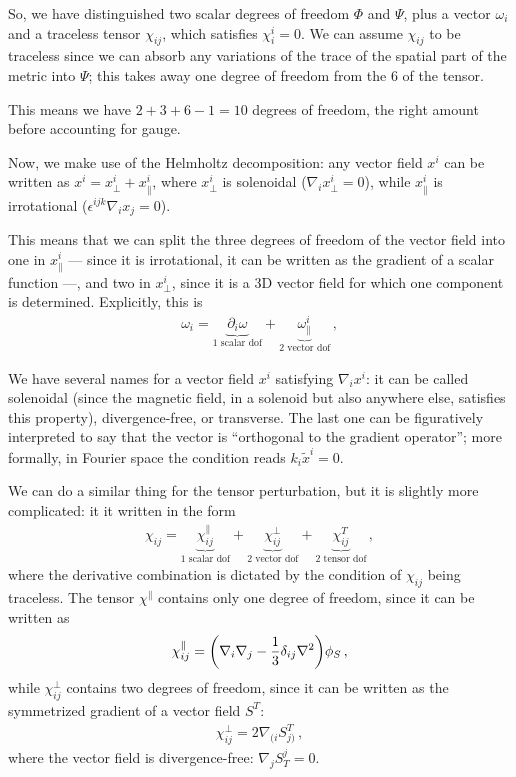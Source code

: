 \documentclass[main.tex]{subfiles}
\begin{document}
So, we have distinguished two scalar degrees of freedom \(\Phi \) and \(\Psi \), plus a vector \(\omega_{i}\) and a traceless tensor \(\chi_{ij}\), which satisfies \(\chi^{i}_{i} = 0 \).
We can assume \(\chi_{ij}\) to be traceless since we can absorb any variations of the trace of the spatial part of the metric into \(\Psi \); this takes away one degree of freedom from the 6 of the tensor. 

This means we have  \(2+ 3 + 6 -1 = 10\) degrees of freedom, the right amount before accounting for gauge. 

Now, we make use of the Helmholtz decomposition: any vector field \(x^{i}\) can be written as \(x^{i} = x^{i}_{\perp} + x^{i}_{\parallel}\), where \(x^{i}_{\perp}\) is solenoidal (\(\nabla_{i} x^{i}_{\perp} = 0\)), while \(x^{i}_{\parallel}\) is irrotational (\(\epsilon^{ijk}\nabla_{i}x_{j} = 0\)). 

This means that we can split the three degrees of freedom of the vector field into one in \(x^{i}_{\parallel}\) --- since it is irrotational, it can be written as the gradient of a scalar function ---, and two in \(x^{i}_{\perp}\), since it is a 3D vector field for which one component is determined. Explicitly, this is 
%
\begin{align}
\omega_{i} = \underbrace{\partial_{i} \omega}_{\text{1 scalar dof}}  + \underbrace{\omega^{i}_{\parallel}}_{\text{2 vector dof}}
\,,
\end{align}
%


We have several names for a vector field \(x^{i}\) satisfying \(\nabla_{i} x^{i}\): it can be called solenoidal (since the magnetic field, in a solenoid but also anywhere else, satisfies this property), divergence-free, or transverse.
The last one can be figuratively interpreted to say that the vector is ``orthogonal to the gradient operator''; more formally, in Fourier space the condition reads \(k_{i} \widetilde{x}^{i} = 0\). 

We can do a similar thing for the tensor perturbation, but it is slightly more complicated: it it written in the form 
%
\begin{align}
\chi_{ij} = 
\underbrace{\chi_{ij}^{\parallel}}_{\text{1 scalar dof}} + 
\underbrace{\chi_{ij}^{\perp}}_{\text{2 vector dof}} + 
\underbrace{\chi_{ij}^{T}}_{\text{2 tensor dof}} 
\,,
\end{align}
%
where the derivative combination is dictated by the condition of \(\chi_{ij}\) being traceless. 
The tensor \(\chi^{\parallel}\) contains only one degree of freedom, since it can be written as 
%
\begin{align}
\chi^{\parallel}_{ij} = \qty(\nabla_{i} \nabla_{j} - \frac{1}{3} \delta_{ij}\nabla^2) \phi_{S}
\,,
\end{align}
%
while \(\chi^{\perp}_{ij}\) contains two degrees of freedom, since it can be written as the symmetrized gradient of a vector field \(S^{T}\):
%
\begin{align}
\chi^{\perp}_{ij} = 2 \nabla_{(i} S_{j)}^{T}
\,,
\end{align}
%
where the vector field is divergence-free: \(\nabla_{j} S^{j}_{T} = 0\).
\end{document}
